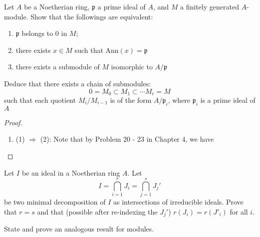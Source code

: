 \documentclass{solution}
\begin{document}
\begin{problem}
    Let $A$ be a Noetherian ring, $\mathfrak{p}$ a prime ideal of $A$, and $M$ a finitely generated $A$-module. Show that the followings are equivalent:
    \begin{enumerate}
        \item $\mathfrak{p}$ belongs to $0$ in $M$;
        \item there exists $x \in M$ such that $\mathrm{Ann}(x) = \mathfrak{p}$
        \item there exists a submodule of $M$ isomorphic to $A / \mathfrak{p}$
    \end{enumerate}
    Deduce that there exists a chain of submodules:
    $$0 = M_0 \subset M_1 \subset \cdots M_r = M$$
    such that each quotient $M_i / M_{i - 1}$ is of the form $A / \mathfrak{p}_i$, where $\mathfrak{p}_i$ is a prime ideal of $A$
\end{problem}

\begin{proof}
    \begin{enumerate}
        \item (1) $\Rightarrow$ (2): Note that by Problem 20 - 23 in Chapter 4, we have \TODO
    \end{enumerate}
\end{proof}

\begin{problem}
    Let $I$ be an ideal in a Noetherian ring $A$. Let
    $$I = \bigcap\limits_{i = 1}^{r} J_i = \bigcap\limits_{j = 1}^{s} J_j'$$
    be two minimal decomposition of $I$ as intersections of irreducible ideals. Prove that $r = s$ and that (possible after re-indexing the $J_j'$) $r(J_i) = r(J'_i)$ for all $i$.

    State and prove an analogous result for modules.
\end{problem}
\end{document}
